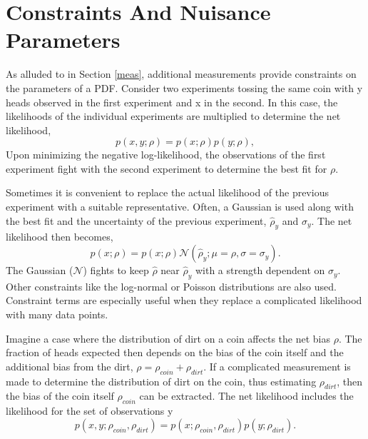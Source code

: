 \section{Constraints And Nuisance Parameters}
\label{constraints}

As alluded to in Section \ref{meas}, additional measurements provide constraints on the parameters of a PDF. Consider two experiments tossing the same coin with y heads observed in the first experiment and x in the second. In this case, the likelihoods of the individual experiments are multiplied to determine the net likelihood, 
\begin{equation}
p(x, y; \rho) = p(x; \rho)p(y; \rho),
\end{equation}
Upon minimizing the negative log-likelihood, the observations of the first experiment fight with the second experiment to determine the best fit for $\rho$. 

Sometimes it is convenient to replace the actual likelihood of the previous experiment with a suitable representative. Often, a Gaussian is used along with the best fit and the uncertainty of the previous experiment, $\hat{\rho}_{y}$ and $\sigma_y$. The net likelihood then becomes,
\begin{equation}
p(x; \rho) = p(x; \rho) \mathcal{N}(\hat{\rho}_y; \mu=\rho, \sigma=\sigma_y).
\end{equation}
The Gaussian ($\mathcal{N}$) fights to keep $\hat{\rho}$ near $\hat{\rho}_y$ with a strength dependent on $\sigma_y$. Other constraints like the log-normal or Poisson distributions are also used. Constraint terms are especially useful when they replace a complicated likelihood with many data points. 

Imagine a case where the distribution of dirt on a coin affects the net bias $\rho$. The fraction of heads expected then depends on the bias of the coin itself and the additional bias from the dirt, $\rho = \rho_{coin} + \rho_{dirt}$. If a complicated measurement is made to determine the distribution of dirt on the coin, thus estimating $\rho_{dirt}$, then the bias of the coin itself $\rho_{coin}$ can be extracted. The net likelihood includes the likelihood for the set of observations y
\begin{equation}
p(x, y; \rho_{coin}, \rho_{dirt}) = p(x; \rho_{coin}, \rho_{dirt})p(y; \rho_{dirt}).
\end{equation}

